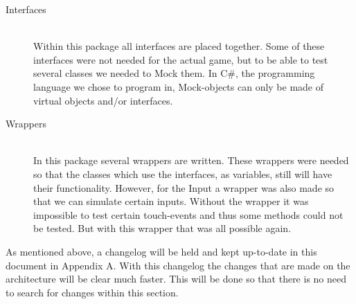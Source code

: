 \documentclass[11pt,twoside,a4paper]{article}
\begin{document}
\begin{description}
\item[Interfaces] \hfill \\
    Within this package all interfaces are placed together. Some of these interfaces were not needed for the actual game, but to be able to test several classes we needed to Mock them. In C\#, the programming language we chose to program in, Mock-objects can only be made of virtual objects and/or interfaces. 
\item[Wrappers] \hfill \\
    In this package several wrappers are written. These wrappers were needed so that the classes which use the interfaces, as variables, still will have their functionality. However, for the Input a wrapper was also made so that we can simulate certain inputs. Without the wrapper it was impossible to test certain touch-events and thus some methods could not be tested. But with this wrapper that was all possible again.
    
\end{description}

As mentioned above, a changelog will be held and kept up-to-date in this document in Appendix A. With this changelog the changes that are made on the architecture will be clear much faster. This will be done so that there is no need to search for changes within this section. 

\newpage
\end{document}
